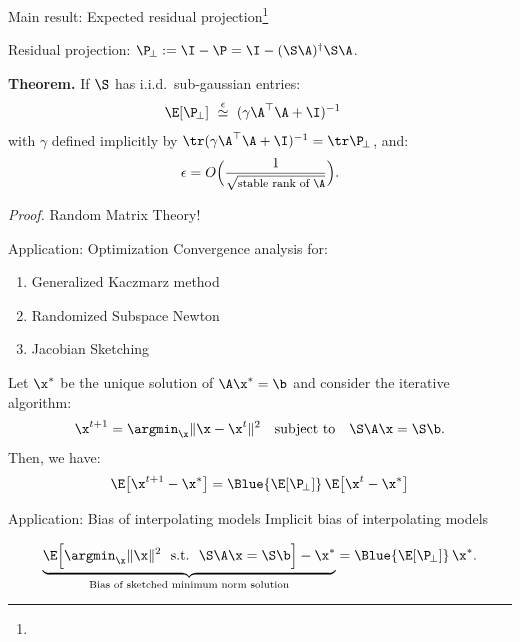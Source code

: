 \begin{frame}{Main result: Expected residual projection\footnote{\tiny{}}}
    \vspace{5mm}
    
    Residual projection: $\P_{\!\perp} := \I - \P = \I -
    (\S\A)^\dagger\S\A$.

\textbf{Theorem.}  If $\S$ has i.i.d.~sub-gaussian entries:
\begin{align*}
    \E[\P_{\!\perp}]\
   &\overset\epsilon\simeq \ (\gamma\A^\top\A + \I)^{-1}
\end{align*}
with $\gamma$ defined implicitly by
$\tr (\gamma\A^\top\A + \I)^{-1}=\tr\P_{\!\perp}$, and:
\begin{align*}
  \epsilon = O\Big(\frac1{\sqrt{\text{\footnotesize stable rank of $\A$}}}\Big).
\end{align*}

\textit{Proof.}  Random Matrix Theory!

\end{frame}



\begin{frame}{Application: Optimization}
    Convergence analysis for:
  \begin{enumerate}
  \item Generalized Kaczmarz method \parencite{generalized-kaczmarz}
  \item Randomized Subspace Newton  \parencite{Gower2019}
  \item Jacobian Sketching \parencite{jacsketch}
  \end{enumerate}
  
  \pause

    Let $\x^*$
    be the unique solution of $\A\x^*=\b$ and consider
  the iterative algorithm:
  \begin{align*}
    \x^{t+1} = \argmin_{\x} \|\x-\x^t\|^2\quad\textnormal{subject to}\quad\S\A\x=\S\b.
  \end{align*}
Then, we have:
  \begin{align*}
    \E\big[\x^{t+1}-\x^*\big] =
    \Blue{\E[\P_{\!\perp}]}\,\E\big[\x^t-\x^*\big]
  \end{align*}
\end{frame}

\begin{frame}{Application: Bias of interpolating models}
Implicit bias of interpolating models \parencite{surrogate-design}


\begin{align*}
  \underbrace{\E\Big[\argmin_{\x} \|\x\|^2\ \ \textnormal{s.t.}\ \
    \S\A\x=\S\b\Big] - \x^*}_{\text{Bias of sketched minimum norm
  solution}}
  = \Blue{\E[\P_{\!\perp}]}\,\x^*.
\end{align*}
\end{frame}


